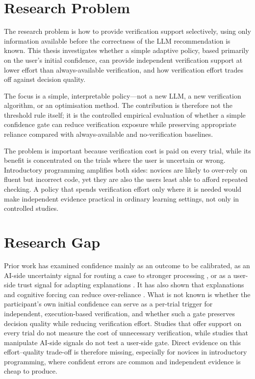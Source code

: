 \documentclass[oneside,final,14pt,a4paper]{extreport}
\begin{document}
\section{Research Problem}
\label{sec:problem}

The research problem is how to provide verification support selectively, using
only information available before the correctness of the LLM recommendation is
known. This thesis investigates whether a simple adaptive policy, based
primarily on the user's initial confidence, can provide independent verification
support at lower effort than always-available verification, and how verification
effort trades off against decision quality.

The focus is a simple, interpretable policy---not a new LLM, a new verification
algorithm, or an optimisation method. The contribution is therefore not the
threshold rule itself; it is the controlled empirical evaluation of whether a
simple confidence gate can reduce verification exposure while preserving
appropriate reliance compared with always-available and no-verification
baselines.

The problem is important because verification cost is paid on every trial, while
its benefit is concentrated on the trials where the user is uncertain or wrong.
Introductory programming amplifies both sides: novices are likely to over-rely
on fluent but incorrect code, yet they are also the users least able to afford
repeated checking. A policy that spends verification effort only where it is
needed would make independent evidence practical in ordinary learning settings,
not only in controlled studies.

\section{Research Gap}
\label{sec:gap}

Prior work has examined confidence mainly as an outcome to be calibrated, as an
AI-side uncertainty signal for routing a case to stronger processing
\cite{CascadedLM2025}, or as a user-side trust signal for adapting explanations
\cite{SrinivasanAdjustForTrust}. It has also shown that explanations and
cognitive forcing can reduce over-reliance
\cite{Bucinca2021,Bo2025,Schemmer2022}. What is not known is whether the
participant's own initial confidence can serve as a per-trial trigger for
independent, execution-based verification, and whether such a gate preserves
decision quality while reducing verification effort. Studies that offer support
on every trial do not measure the cost of unnecessary verification, while
studies that manipulate AI-side signals do not test a user-side gate. Direct
evidence on this effort--quality trade-off is therefore missing, especially for
novices in introductory programming, where confident errors are common and
independent evidence is cheap to produce.
\end{document}
